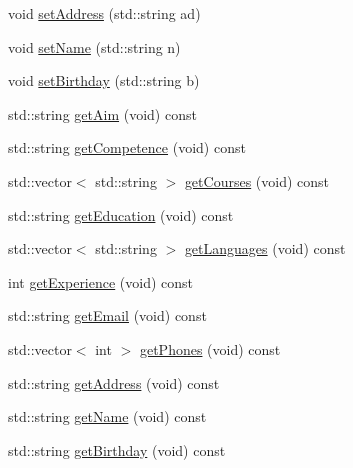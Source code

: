\begin{DoxyCompactItemize}
\item 
void \hyperlink{class_resume_a03adc6528b2ed6302008a249109005a8}{set\+Address} (std\+::string ad)
\item 
void \hyperlink{class_resume_a47a244bcf3498360be01b98c8773c847}{set\+Name} (std\+::string n)
\item 
void \hyperlink{class_resume_abc51f92eaaab42d9973693424147a421}{set\+Birthday} (std\+::string b)
\item 
std\+::string \hyperlink{class_resume_a65f42d7448ffe5ecdbc33663ad9339e0}{get\+Aim} (void) const
\item 
std\+::string \hyperlink{class_resume_afd0ba86a30b73693a6eda28c9ecf7860}{get\+Competence} (void) const
\item 
std\+::vector$<$ std\+::string $>$ \hyperlink{class_resume_ac4c445be5628971ce45ab02213e6769f}{get\+Courses} (void) const
\item 
std\+::string \hyperlink{class_resume_af57d4658748a7e718d546594bfd74450}{get\+Education} (void) const
\item 
std\+::vector$<$ std\+::string $>$ \hyperlink{class_resume_a48cfbd4c9c8a100deb4656b7f83402cc}{get\+Languages} (void) const
\item 
int \hyperlink{class_resume_ad8abe2f52e3a5b4f730c87ab297ea99a}{get\+Experience} (void) const
\item 
std\+::string \hyperlink{class_resume_af38cb080447a7c96b20026999fd330ee}{get\+Email} (void) const
\item 
std\+::vector$<$ int $>$ \hyperlink{class_resume_a3ca8f1b8a98de8dfe7ac3897f2577ca2}{get\+Phones} (void) const
\item 
std\+::string \hyperlink{class_resume_af11a5f3bfadd89987d4603190647a89d}{get\+Address} (void) const
\item 
std\+::string \hyperlink{class_resume_a7e20376daab81badef8a7edfa1f422d8}{get\+Name} (void) const
\item 
std\+::string \hyperlink{class_resume_a68cfeeffdaa6cb63701593b2c086d274}{get\+Birthday} (void) const
\end{DoxyCompactItemize}
